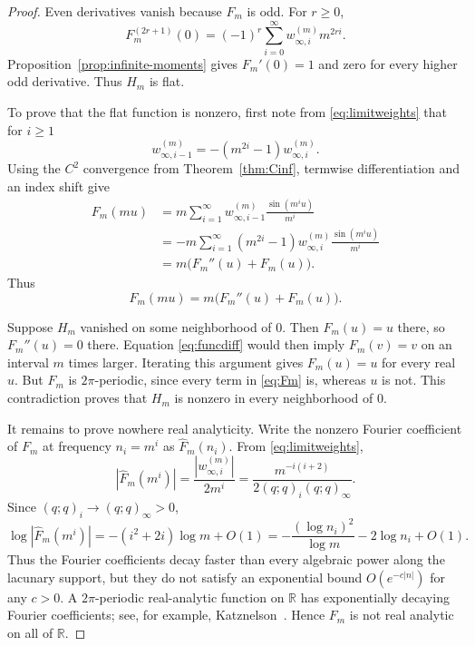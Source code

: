 \documentclass[11pt]{article}
\theoremstyle{remark}
\begin{document}
\begin{proof}
Even derivatives vanish because $F_m$ is odd.  For $r\ge0$,
\[
F_m^{(2r+1)}(0)
=(-1)^r
\sum_{i=0}^{\infty}w^{(m)}_{\infty,i}m^{2ri}.
\]
Proposition~\ref{prop:infinite-moments} gives $F_m'(0)=1$ and zero for every
higher odd derivative.  Thus $H_m$ is flat.

To prove that the flat function is nonzero, first note from
\eqref{eq:limitweights} that for $i\ge1$
\begin{equation}
w^{(m)}_{\infty,i-1}
=-(m^{2i}-1)w^{(m)}_{\infty,i}.
\label{eq:weightratio}
\end{equation}
Using the $C^2$ convergence from Theorem~\ref{thm:Cinf}, termwise
differentiation and an index shift give
\begin{align*}
F_m(mu)
&=m\sum_{i=1}^{\infty}w^{(m)}_{\infty,i-1}
\frac{\sin(m^iu)}{m^i}\\
&=-m\sum_{i=1}^{\infty}(m^{2i}-1)w^{(m)}_{\infty,i}
\frac{\sin(m^iu)}{m^i}\\
&=m\bigl(F_m''(u)+F_m(u)\bigr).
\end{align*}
Thus
\begin{equation}
F_m(mu)=m\bigl(F_m''(u)+F_m(u)\bigr).
\label{eq:funcdiff}
\end{equation}

Suppose $H_m$ vanished on some neighborhood of $0$.  Then $F_m(u)=u$ there,
so $F_m''(u)=0$ there.  Equation \eqref{eq:funcdiff} would then imply
$F_m(v)=v$ on an interval $m$ times larger.  Iterating this argument gives
$F_m(u)=u$ for every real $u$.  But $F_m$ is $2\pi$-periodic, since every term
in \eqref{eq:Fm} is, whereas $u$ is not.  This contradiction proves that
$H_m$ is nonzero in every neighborhood of $0$.

It remains to prove nowhere real analyticity.  Write the nonzero Fourier
coefficient of $F_m$ at frequency $n_i=m^i$ as $\widehat F_m(n_i)$.  From
\eqref{eq:limitweights},
\[
|\widehat F_m(m^i)|
=\frac{|w^{(m)}_{\infty,i}|}{2m^i}
=\frac{m^{-i(i+2)}}{2(q;q)_i(q;q)_\infty}.
\]
Since $(q;q)_i\to(q;q)_\infty>0$,
\begin{equation}
\log |\widehat F_m(m^i)|
=-(i^2+2i)\log m+O(1)
=-\frac{(\log n_i)^2}{\log m}-2\log n_i+O(1).
\label{eq:fourierdecay}
\end{equation}
Thus the Fourier coefficients decay faster than every algebraic power along
the lacunary support, but they do not satisfy an exponential bound
$O(e^{-c|n|})$ for any $c>0$.  A $2\pi$-periodic real-analytic function on
$\mathbb R$ has exponentially decaying Fourier coefficients; see, for example,
Katznelson~\cite[Chapter~I]{Katznelson2004}.  Hence $F_m$ is not real analytic
on all of $\mathbb R$.


\end{proof}
\end{document}
